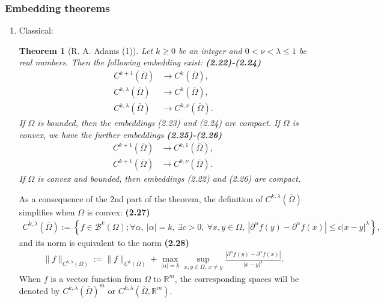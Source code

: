 \documentclass{book}
\numberwithin{equation}{section}
\newtheorem{theorem}{Theorem}[section]
\begin{document}
\subsubsection{Embedding theorems}
\begin{enumerate}
    \item Classical:
    
    \begin{theorem}[R. A. Adams (1)]
        Let $k\ge 0$ be an integer and $0 < \nu < \lambda\le 1$ be real numbers. Then the following embedding exist: \textbf{(2.22)-(2.24)}
        \begin{align*}
            C^{k+1}(\overline{\Omega})&\to C^k(\overline{\Omega}),\\
            C^{k,\lambda}(\overline{\Omega})&\to C^k(\overline{\Omega}),\\
            C^{k,\lambda}(\overline{\Omega})&\to C^{k,\nu}(\overline{\Omega}).
        \end{align*}
        If $\Omega$ is bounded, then the embeddings (2.23) and (2.24) are compact. If $\Omega$ is convex, we have the further embeddings \textbf{(2.25)-(2.26)}
        \begin{align*}
            C^{k+1}(\overline{\Omega})&\to C^{k,1}(\overline{\Omega}),\\
            C^{k+1}(\overline{\Omega})&\to C^{k,\nu}(\overline{\Omega}).
        \end{align*}
        If $\Omega$ is convex and bounded, then embeddings (2.22) and (2.26) are compact.
    \end{theorem}
    As a consequence of the 2nd part of the theorem, the definition of $C^{k,\lambda}(\overline{\Omega})$ simplifies when $\Omega$ is convex: \textbf{(2.27)}
    \begin{align*}
        C^{k,\lambda}(\overline{\Omega}) := \left\{f\in\mathcal{B}^k(\Omega);\forall\alpha,\ |\alpha| = k,\ \exists c > 0,\ \forall x,y\in\Omega,\ \left|\partial^\alpha f(y) - \partial^\alpha f(x)\right|\le c\left|x - y\right|^\lambda\right\},
    \end{align*}
    and its norm is equivalent to the norm \textbf{(2.28)}
    \begin{align*}
        \|f\|_{C^{k,\lambda}(\Omega)} := \|f\|_{C^k(\Omega)} + \max_{|\alpha| = k}\sup_{x,y\in\Omega,\, x\ne y} \frac{\left|\partial^\alpha f(y) - \partial^\alpha f(x)\right|}{\left|x - y\right|^\lambda}.
    \end{align*}
    When $f$ is a vector function from $\Omega$ to $\mathbb{R}^m$, the corresponding spaces will be denoted by $C^{k,\lambda}(\overline{\Omega})^m$ or $C^{k,\lambda}(\overline{\Omega},\mathbb{R}^m)$.

\end{enumerate}
\end{document}
